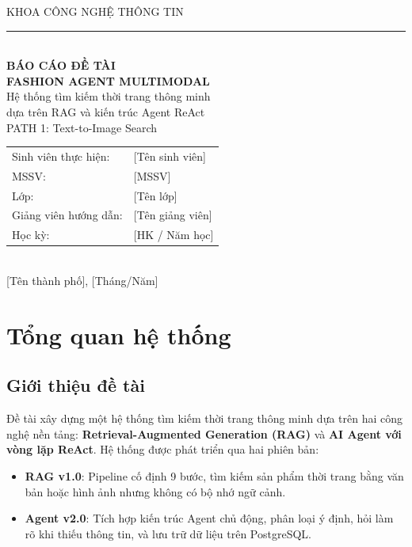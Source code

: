 \documentclass[12pt,a4paper]{report}
\begin{document}
\begin{titlepage}
\centering
\vspace*{1cm}
{\Large KHOA CÔNG NGHỆ THÔNG TIN}\\[0.5cm]
\rule{\textwidth}{1pt}\\[1cm]
{\Huge\bfseries BÁO CÁO ĐỀ TÀI}\\[0.8cm]
{\LARGE\bfseries FASHION AGENT MULTIMODAL}\\[0.5cm]
{\Large Hệ thống tìm kiếm thời trang thông minh\\dựa trên RAG và kiến trúc Agent ReAct}\\[0.5cm]
{\large PATH 1: Text-to-Image Search}\\[2cm]
\begin{tabular}{ll}
Sinh viên thực hiện: & [Tên sinh viên]\\
MSSV: & [MSSV]\\
Lớp: & [Tên lớp]\\
Giảng viên hướng dẫn: & [Tên giảng viên]\\
Học kỳ: & [HK / Năm học]\\
\end{tabular}\\[2cm]
{\large [Tên thành phố], [Tháng/Năm]}
\end{titlepage}

\tableofcontents
\newpage

\chapter{Tổng quan hệ thống}

\section{Giới thiệu đề tài}
Đề tài xây dựng một hệ thống tìm kiếm thời trang thông minh dựa trên hai công nghệ nền tảng: \textbf{Retrieval-Augmented Generation (RAG)} và \textbf{AI Agent với vòng lặp ReAct}. Hệ thống được phát triển qua hai phiên bản:

\begin{itemize}
    \item \textbf{RAG v1.0}: Pipeline cố định 9 bước, tìm kiếm sản phẩm thời trang bằng văn bản hoặc hình ảnh nhưng không có bộ nhớ ngữ cảnh.
    \item \textbf{Agent v2.0}: Tích hợp kiến trúc Agent chủ động, phân loại ý định, hỏi làm rõ khi thiếu thông tin, và lưu trữ dữ liệu trên PostgreSQL.
\end{itemize}
\end{document}
